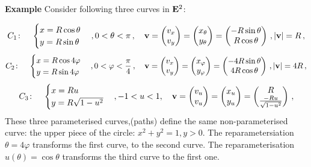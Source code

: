 \documentclass[12pt]{article}
\numberwithin{equation}{section}
\begin{document}
  {\bf Example}  Consider following  three curves in ${\bf E}^2$:

\begin{equation*}\label{threedifparametrisations}
  C_1\colon\quad\begin{cases}
  x=R\cos\theta\\
  y=R\sin\theta\\
  \end{cases},
0<\theta<{\pi}\,,
     \quad
   {\bf v}=
         \begin{pmatrix}
        v_x\cr v_y\cr
   \end{pmatrix}=
         \begin{pmatrix}
        x_\theta\cr y_\theta\cr
   \end{pmatrix}=
         \begin{pmatrix}
        -R\sin\theta\cr R\cos\theta\cr
   \end{pmatrix}\,, |{\bf v}|=R\,,
    \end{equation*}
\begin{equation*}
  C_2\colon\quad\begin{cases}
  x=R\cos 4\varphi\\
  y=R\sin 4\varphi\\
  \end{cases},
0<\varphi<{\pi\over 4}\,,
           \quad
   {\bf v}=
         \begin{pmatrix}
        v_x\cr v_y\cr
   \end{pmatrix}=
         \begin{pmatrix}
        x_\varphi\cr y_\varphi\cr
   \end{pmatrix}=
         \begin{pmatrix}
        -4R\sin\theta\cr 4R\cos\theta\cr
   \end{pmatrix}\,, |{\bf v}|=4R\,,
  \end{equation*}
 \begin{equation}
 C_3\colon\quad
\begin{cases}
  x=Ru\\
  y=R\sqrt {1-u^2}\\
  \end{cases},
  -1<u<1,
       \quad
   {\bf v}=
         \begin{pmatrix}
        v_u\cr v_u\cr
   \end{pmatrix}=
         \begin{pmatrix}
        x_u\cr y_u\cr
   \end{pmatrix}=
         \begin{pmatrix}
        R\cr {-Ru\over \sqrt {1-u^2}}\cr
   \end{pmatrix}\,,
\end{equation}
 These three parameterised curves,(paths) define the same non-parameterised
 curve: the upper piece of the circle: $x^2+y^2=1, y>0$.
The reparametersiation   $\theta=4\varphi$
transforms the first curve, to the second curve.
The reparameterisation $u(\theta)=\cos \theta$ transforms
the third  curve to the first one.
\end{document}
